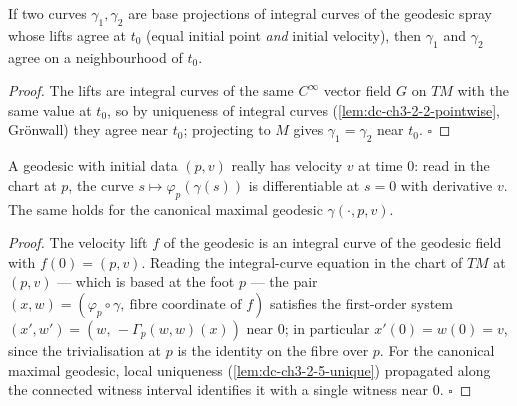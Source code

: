 \begin{lemma}
  \label{lem:dc-ch3-2-5-unique}
  \leanok
  If two curves $\gamma_1,\gamma_2$ are base projections of integral curves of the
  geodesic spray whose lifts agree at $t_0$ (equal initial point \emph{and} initial
  velocity), then $\gamma_1$ and $\gamma_2$ agree on a neighbourhood of $t_0$.
\end{lemma}
\begin{proof}
  \leanok
  The lifts are integral curves of the same $C^\infty$ vector field $G$ on $TM$
  with the same value at $t_0$, so by uniqueness of integral curves
  (\cref{lem:dc-ch3-2-2-pointwise}, Gr\"onwall) they agree near $t_0$; projecting to $M$
  gives $\gamma_1=\gamma_2$ near $t_0$. $\square$
\end{proof}

\begin{lemma}
  \label{lem:dc-ch3-2-5-velocity}
  \leanok
  A geodesic with initial data $(p,v)$ really has velocity $v$ at time $0$: read
  in the chart at $p$, the curve $s\mapsto\varphi_p(\gamma(s))$ is differentiable
  at $s=0$ with derivative $v$. The same holds for the canonical maximal
  geodesic $\gamma(\cdot,p,v)$.
\end{lemma}
\begin{proof}
  \leanok
  The velocity lift $f$ of the geodesic is an integral curve of the geodesic
  field with $f(0)=(p,v)$. Reading the integral-curve equation in the chart of
  $TM$ at $(p,v)$ — which is based at the foot $p$ — the pair
  $(x,w)=(\varphi_p\circ\gamma,\ \text{fibre coordinate of }f)$ satisfies the
  first-order system $(x',w')=(w,\,-\Gamma_p(w,w)(x))$ near $0$; in particular
  $x'(0)=w(0)=v$, since the trivialisation at $p$ is the identity on the fibre
  over $p$. For the canonical maximal geodesic, local uniqueness
  (\cref{lem:dc-ch3-2-5-unique}) propagated along the connected witness interval
  identifies it with a single witness near $0$. $\square$
\end{proof}


